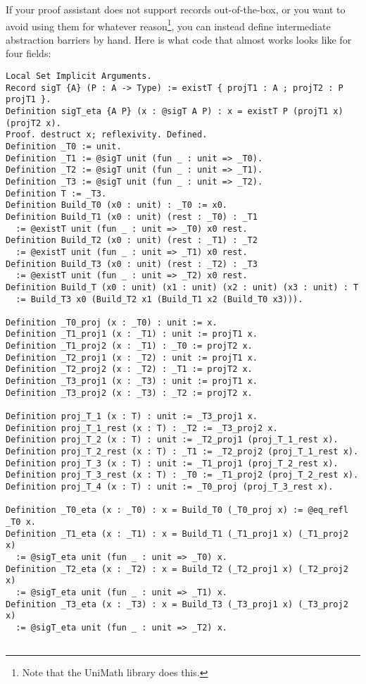   If your proof assistant does not support records out-of-the-box, or you want to avoid using them for whatever reason\footnote{Note that the UniMath library  does this. }, you can instead define intermediate abstraction barriers by hand.
  Here is what code that almost works looks like for four fields:
\begin{verbatim}
Local Set Implicit Arguments.
Record sigT {A} (P : A -> Type) := existT { projT1 : A ; projT2 : P projT1 }.
Definition sigT_eta {A P} (x : @sigT A P) : x = existT P (projT1 x) (projT2 x).
Proof. destruct x; reflexivity. Defined.
Definition _T0 := unit.
Definition _T1 := @sigT unit (fun _ : unit => _T0).
Definition _T2 := @sigT unit (fun _ : unit => _T1).
Definition _T3 := @sigT unit (fun _ : unit => _T2).
Definition T := _T3.
Definition Build_T0 (x0 : unit) : _T0 := x0.
Definition Build_T1 (x0 : unit) (rest : _T0) : _T1
  := @existT unit (fun _ : unit => _T0) x0 rest.
Definition Build_T2 (x0 : unit) (rest : _T1) : _T2
  := @existT unit (fun _ : unit => _T1) x0 rest.
Definition Build_T3 (x0 : unit) (rest : _T2) : _T3
  := @existT unit (fun _ : unit => _T2) x0 rest.
Definition Build_T (x0 : unit) (x1 : unit) (x2 : unit) (x3 : unit) : T
  := Build_T3 x0 (Build_T2 x1 (Build_T1 x2 (Build_T0 x3))).

Definition _T0_proj (x : _T0) : unit := x.
Definition _T1_proj1 (x : _T1) : unit := projT1 x.
Definition _T1_proj2 (x : _T1) : _T0 := projT2 x.
Definition _T2_proj1 (x : _T2) : unit := projT1 x.
Definition _T2_proj2 (x : _T2) : _T1 := projT2 x.
Definition _T3_proj1 (x : _T3) : unit := projT1 x.
Definition _T3_proj2 (x : _T3) : _T2 := projT2 x.

Definition proj_T_1 (x : T) : unit := _T3_proj1 x.
Definition proj_T_1_rest (x : T) : _T2 := _T3_proj2 x.
Definition proj_T_2 (x : T) : unit := _T2_proj1 (proj_T_1_rest x).
Definition proj_T_2_rest (x : T) : _T1 := _T2_proj2 (proj_T_1_rest x).
Definition proj_T_3 (x : T) : unit := _T1_proj1 (proj_T_2_rest x).
Definition proj_T_3_rest (x : T) : _T0 := _T1_proj2 (proj_T_2_rest x).
Definition proj_T_4 (x : T) : unit := _T0_proj (proj_T_3_rest x).

Definition _T0_eta (x : _T0) : x = Build_T0 (_T0_proj x) := @eq_refl _T0 x.
Definition _T1_eta (x : _T1) : x = Build_T1 (_T1_proj1 x) (_T1_proj2 x)
  := @sigT_eta unit (fun _ : unit => _T0) x.
Definition _T2_eta (x : _T2) : x = Build_T2 (_T2_proj1 x) (_T2_proj2 x)
  := @sigT_eta unit (fun _ : unit => _T1) x.
Definition _T3_eta (x : _T3) : x = Build_T3 (_T3_proj1 x) (_T3_proj2 x)
  := @sigT_eta unit (fun _ : unit => _T2) x.


\end{verbatim}
